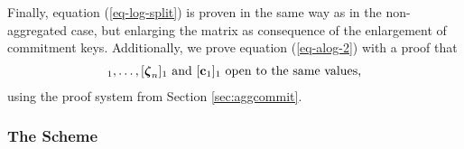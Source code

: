Finally, equation (\ref{eq-log-split}) is proven in the same way as in the non-aggregated case, but enlarging the matrix as consequence of the enlargement of commitment keys. Additionally, we prove equation (\ref{eq-alog-2}) with a proof that
\begin{align*}
[\grkb{\zeta}_1]_1,\ldots,[\grkb{\zeta}_n]_1 \text{ and } [\vecb{c}_1]_1 \text{ open to the same values,}
\end{align*}
using the proof system from Section \ref{sec:aggcommit}.
\iffalse
We prove soundness in the same fashion as the protocols from Chapter \ref{sec:shuf-rp}, that is we guess the index $j^*$ of an element $x_{j^*}\notin S$ in order to choose $\vecb{h}_{j^*}$ linearly independent from the other vectors in $ck$. Similarly as in the non-aggregated case, we will guess the (sub-)path $(b_{j^*,m+1},\ldots, b_{j^*,1})$ (where $b_{j^*,1},\ldots,b_{j^*,m}$ are the uniques openings of, respectively, $[\vecb{d}_1]_2,\ldots,[\vecb{d}]_m$ at position $j^*$) and we will choose, for each $\ell\in[m]$, $\vecb{g}_{\ell,\alpha_{j^*,\ell}}$ linearly independent from the other vectors in $ck_\ell$, where $\alpha_{j^*,\ell}:=(\alpha_{j^*}-1 \mod 2^{\ell-1})+1$. With such choice of the commitment keys, we will be able to prove that $x_{j^*}=s_{\alpha_{j^*}}$ unless we can break some hardness assumption.
Consequently, the total security loss in the reduction will be of a factor of $\frac{2}{nt}$.  
\fi
\subsubsection{The Scheme}

